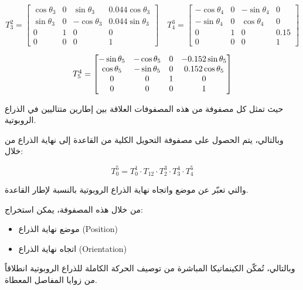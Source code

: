 \[
T_3^2 =
\begin{bmatrix}
\cos\theta_{3} & 0 & \sin\theta_{3} & 0.044\cos\theta_{3} \\
\sin\theta_{3} & 0 & -\cos\theta_{3} & 0.044\sin\theta_{3} \\
0 & 1 & 0 & 0 \\
0 & 0 & 0 & 1
\end{bmatrix}
\quad
T_4^3 =
\begin{bmatrix}
-\cos\theta_{4} & 0 & -\sin\theta_{4} & 0 \\
-\sin\theta_{4} & 0 & \cos\theta_{4}  & 0 \\
0               & 1 & 0               & 0.15 \\
0               & 0 & 0               & 1
\end{bmatrix}
\]

\[
\makebox[\textwidth][c]{
$
T_5^4 =
\begin{bmatrix}
-\sin\theta_{5} & -\cos\theta_{5} & 0 & -0.152\sin\theta_{5} \\
\cos\theta_{5}  & -\sin\theta_{5} & 0 & 0.152\cos\theta_{5} \\
0               & 0               & 1 & 0 \\
0               & 0               & 0 & 1
\end{bmatrix}
$
}
\]






حيث تمثل كل مصفوفة من هذه المصفوفات العلاقة بين إطارين متتاليين في الذراع الروبوتية.

وبالتالي، يتم الحصول على مصفوفة التحويل الكلية من القاعدة إلى نهاية الذراع من خلال:

\[
T_0^5 = T_0^1 \cdot T_{12} \cdot T_2^3 \cdot T_3^4 \cdot T_4^5
\]

والتي تعبّر عن موضع واتجاه نهاية الذراع الروبوتية بالنسبة لإطار القاعدة.

من خلال هذه المصفوفة، يمكن استخراج:
\begin{itemize}
    \item موضع نهاية الذراع (Position)
    \item اتجاه نهاية الذراع (Orientation)
\end{itemize}

وبالتالي، تُمكّن الكينماتيكا المباشرة من توصيف الحركة الكاملة للذراع الروبوتية انطلاقاً من زوايا المفاصل المعطاة.